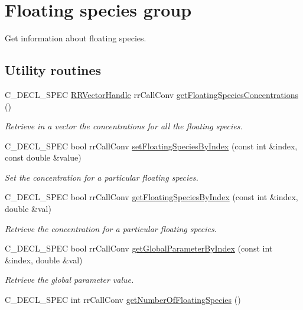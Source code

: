 \hypertarget{group__floating}{
\section{\-Floating species group}
\label{group__floating}
}


\-Get information about floating species.  


\subsection*{\-Utility routines}
\begin{DoxyCompactItemize}
\item 
\-C\-\_\-\-D\-E\-C\-L\-\_\-\-S\-P\-E\-C \hyperlink{rr__c__types_8h_aea46a16752b0ae2cd95c009030ee630e}{\-R\-R\-Vector\-Handle} \*
rr\-Call\-Conv \hyperlink{group__utility_ga0db8fe5f89985f27ea4ddb3c595b16fd}{get\-Floating\-Species\-Concentrations} ()
\begin{DoxyCompactList}\small\item\em \-Retrieve in a vector the concentrations for all the floating species. \end{DoxyCompactList}\item 
\-C\-\_\-\-D\-E\-C\-L\-\_\-\-S\-P\-E\-C bool rr\-Call\-Conv \hyperlink{group__utility_gaf4a5a4d9b1ecf60d4b98189b4bcf2543}{set\-Floating\-Species\-By\-Index} (const int \&index, const double \&value)
\begin{DoxyCompactList}\small\item\em \-Set the concentration for a particular floating species. \end{DoxyCompactList}\item 
\-C\-\_\-\-D\-E\-C\-L\-\_\-\-S\-P\-E\-C bool rr\-Call\-Conv \hyperlink{group__utility_gab73fad6a1dfdb2b2d393964354d94c69}{get\-Floating\-Species\-By\-Index} (const int \&index, double \&val)
\begin{DoxyCompactList}\small\item\em \-Retrieve the concentration for a particular floating species. \end{DoxyCompactList}\item 
\-C\-\_\-\-D\-E\-C\-L\-\_\-\-S\-P\-E\-C bool rr\-Call\-Conv \hyperlink{group__utility_ga1aae76d21a054da6ed6cc734ad10287a}{get\-Global\-Parameter\-By\-Index} (const int \&index, double \&val)
\begin{DoxyCompactList}\small\item\em \-Retrieve the global parameter value. \end{DoxyCompactList}\item 
\hypertarget{group__utility_ga9a96b81c58073caff01ea2c9e0f5e119}{
\-C\-\_\-\-D\-E\-C\-L\-\_\-\-S\-P\-E\-C int rr\-Call\-Conv \hyperlink{group__utility_ga9a96b81c58073caff01ea2c9e0f5e119}{get\-Number\-Of\-Floating\-Species} ()}
\label{group__utility_ga9a96b81c58073caff01ea2c9e0f5e119}


\end{DoxyCompactItemize}
